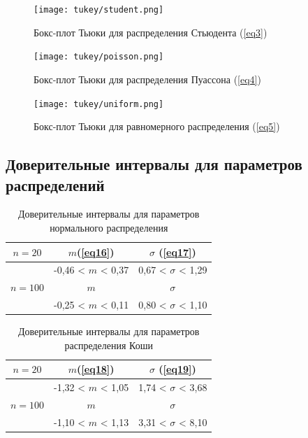 \begin{figure}[H]
    \centering
    \texttt{[image: tukey/student.png]}
    \caption{Бокс-плот Тьюки для распределения Стьюдента (\ref{eq3})}
    \label{fig8}
\end{figure}

\begin{figure}[H]
    \centering
    \texttt{[image: tukey/poisson.png]}
    \caption{Бокс-плот Тьюки для распределения Пуассона (\ref{eq4})}
    \label{fig9}
\end{figure}

\begin{figure}[H]
    \centering
    \texttt{[image: tukey/uniform.png]}
    \caption{Бокс-плот Тьюки для равномерного распределения (\ref{eq5})}
    \label{fig10}
\end{figure}

\subsection{Доверительные интервалы для параметров распределений}

\begin{table}[H]
\centering
\begin{tabular}{ |c|c|c| } 
 \hline
 $n = 20$ & $m$(\ref{eq16}) & $\sigma$ (\ref{eq17})\\ 
 \hline
  & -0,46 < $m$ < 0,37 & 0,67 < $\sigma$ < 1,29\\ 
  \hline
  $n = 100$ & $m$ & $\sigma$ \\
  \hline
  & -0,25 < $m$ < 0,11 & 0,80 < $\sigma$ < 1,10\\ 
 \hline
\end{tabular}
\caption{Доверительные интервалы для параметров нормального распределения}
    \label{table:6}
\end{table}

\begin{table}[H]
\centering
\begin{tabular}{ |c|c|c| } 
 \hline
 $n = 20$ & $m$(\ref{eq18}) & $\sigma$ (\ref{eq19})\\ 
 \hline
  & -1,32 < $m$ < 1,05 & 1,74 < $\sigma$ < 3,68\\ 
  \hline
  $n = 100$ & $m$ & $\sigma$ \\
  \hline
  & -1,10 < $m$ < 1,13 & 3,31 < $\sigma$ < 8,10 \\ 
 \hline
\end{tabular}
\caption{Доверительные интервалы для параметров распределения Коши}
    \label{table:7}
\end{table}

